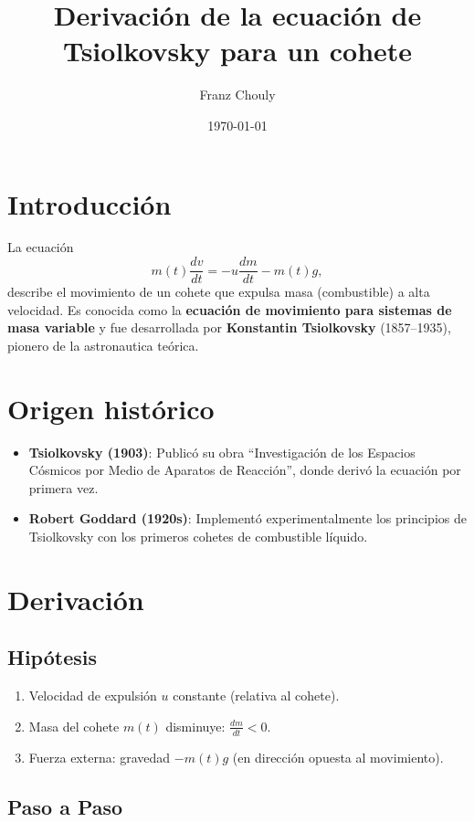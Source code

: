 \documentclass{article}
\title{Derivación de la ecuación de Tsiolkovsky para un cohete}
\author{Franz Chouly}
\date{\today}
\begin{document}
\maketitle

\section{Introducción}
La ecuación
\[
m(t) \frac{dv}{dt} = -u \frac{dm}{dt} - m(t) g,
\]
describe el movimiento de un cohete que expulsa masa (combustible) a alta velocidad. Es conocida como la \textbf{ecuación de movimiento para sistemas de masa variable} y fue desarrollada por \textbf{Konstantin Tsiolkovsky} (1857--1935), pionero de la astronautica teórica.

\section{Origen histórico}
\begin{itemize}
    \item \textbf{Tsiolkovsky (1903)}: Publicó su obra ``Investigación de los Espacios Cósmicos por Medio de Aparatos de Reacción'', donde derivó la ecuación por primera vez.
    \item \textbf{Robert Goddard (1920s)}: Implementó experimentalmente los principios de Tsiolkovsky con los primeros cohetes de combustible líquido.
\end{itemize}

\section{Derivación}
\subsection{Hipótesis}
\begin{enumerate}
    \item Velocidad de expulsión $u$ constante (relativa al cohete).
    \item Masa del cohete $m(t)$ disminuye: $\frac{dm}{dt} < 0$.
    \item Fuerza externa: gravedad $-m(t)g$ (en dirección opuesta al movimiento).
\end{enumerate}

\subsection{Paso a Paso}
\end{document}
